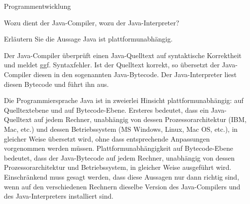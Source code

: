 \begin{frame}[t]%
\smallskip

\begin{exercise}{Programmentwicklung}
\begin{body}
\begin{parts}
\item Wozu dient der Java-Compiler, wozu der Java-Interpreter?
\item Erläutern Sie die Aussage \glqq Java ist plattformunabhängig\grqq.
\end{parts}

\end{body}

\begin{solution}
\begin{parts}
\item Der Java-Compiler überprüft einen Java-Quelltext auf syntaktische Korrektheit und meldet ggf. Syntaxfehler. Ist der Quelltext korrekt, so übersetzt der Java-Compiler diesen in den sogenannten Java-Bytecode. Der Java-Interpreter liest diesen Bytecode und führt ihn aus.

\item
Die Programmiersprache Java ist in zweierlei Hinsicht plattformunabhängig: auf Quelltextebene und auf Bytecode-Ebene. Ersteres bedeutet, dass ein Java-Quelltext auf jedem Rechner, unabhängig von dessen Prozessorarchitektur (IBM, Mac, etc.) und dessen Betriebssystem (MS Windows, Linux, Mac OS, etc.), in gleicher Weise übersetzt wird, ohne dass entsprechende Anpassungen vorgenommen werden müssen. Plattformunabhängigkeit auf Bytecode-Ebene bedeutet, dass der Java-Bytecode auf jedem Rechner, unabhängig von dessen Prozessorarchitektur und Betriebssystem, in gleicher Weise ausgeführt wird. Einschränkend muss gesagt werden, dass diese Aussagen nur dann richtig sind, wenn auf den verschiedenen Rechnern dieselbe Version des Java-Compilers und des Java-Interpreters installiert sind.
\end{parts}
\end{solution}
\end{exercise}

\end{frame}

